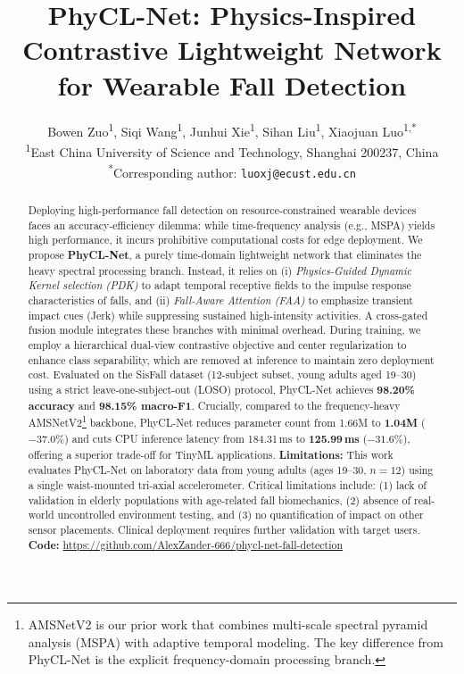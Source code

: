 \documentclass{article}
\title{PhyCL-Net: Physics-Inspired Contrastive Lightweight Network for Wearable Fall Detection}
\author{
	Bowen Zuo\textsuperscript{1}, Siqi Wang\textsuperscript{1}, Junhui Xie\textsuperscript{1}, Sihan Liu\textsuperscript{1}, Xiaojuan Luo\textsuperscript{1,*}\\
	\textsuperscript{1}East China University of Science and Technology, Shanghai 200237, China\\
	\textsuperscript{*}Corresponding author: \texttt{luoxj@ecust.edu.cn}
}
\begin{document}
\maketitle

\begin{abstract}Deploying high-performance fall detection on resource-constrained wearable devices faces an accuracy-efficiency dilemma: while time-frequency analysis (e.g., MSPA) yields high performance, it incurs prohibitive computational costs for edge deployment. We propose \textbf{PhyCL-Net}, a purely time-domain lightweight network that eliminates the heavy spectral processing branch. Instead, it relies on (i) \textit{Physics-Guided Dynamic Kernel selection (PDK)} to adapt temporal receptive fields to the impulse response characteristics of falls, and (ii) \textit{Fall-Aware Attention (FAA)} to emphasize transient impact cues (Jerk) while suppressing sustained high-intensity activities. A cross-gated fusion module integrates these branches with minimal overhead. During training, we employ a hierarchical dual-view contrastive objective and center regularization to enhance class separability, which are removed at inference to maintain zero deployment cost. Evaluated on the SisFall dataset (12-subject subset, young adults aged 19--30) using a strict leave-one-subject-out (LOSO) protocol, PhyCL-Net achieves \textbf{98.20\% accuracy} and \textbf{98.15\% macro-F1}. Crucially, compared to the frequency-heavy AMSNetV2\footnote{AMSNetV2 is our prior work that combines multi-scale spectral pyramid analysis (MSPA) with adaptive temporal modeling. The key difference from PhyCL-Net is the explicit frequency-domain processing branch.} backbone, PhyCL-Net reduces parameter count from 1.66M to \textbf{1.04M} ($-37.0\%$) and cuts CPU inference latency from 184.31\,ms to \textbf{125.99\,ms} ($-31.6\%$), offering a superior trade-off for TinyML applications. \textbf{Limitations:} This work evaluates PhyCL-Net on laboratory data from young adults (ages 19--30, $n=12$) using a single waist-mounted tri-axial accelerometer. Critical limitations include: (1) lack of validation in elderly populations with age-related fall biomechanics, (2) absence of real-world uncontrolled environment testing, and (3) no quantification of impact on other sensor placements. Clinical deployment requires further validation with target users. \textbf{Code:} \url{https://github.com/AlexZander-666/phycl-net-fall-detection}\end{abstract}

\end{document}
